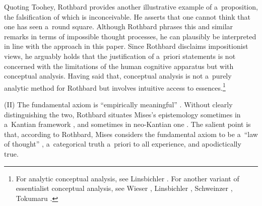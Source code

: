Quoting Toohey, Rothbard 
\parencite*[][p.28]{rothbard_praxeology:_1976} %
 provides another illustrative example of a~proposition, the falsification of which is inconceivable. He asserts that one cannot think that one has seen a~round square. Although Rothbard phrases this and similar remarks in terms of impossible thought processes, he can plausibly be interpreted in line with the approach in this paper. Since Rothbard disclaims impositionist views, he arguably holds that the justification of a~priori statements is not concerned with the limitations of the human cognitive apparatus but with conceptual analysis. Having said that, conceptual analysis is not a~purely analytic method for Rothbard but involves intuitive access to essences.\footnote{For analytic conceptual analysis, see Linsbichler 
\parencite*[][pp.81–83]{linsbichler_was_2017}. %
 For another variant of essentialist conceptual analysis, see Wieser 
\parencite*[][]{wieser_uber_1884}, %
 Linsbichler 
\parencites*[][]{linsbichler_sprachgeist_2021}[][]{linsbichler_case_2023}, %
 Schweinzer 
\parencite*[][]{schweinzer_two_2000}, %
 Tokumaru 
\parencite*[][]{tokumaru_wiesers_2015}.%
}



(II) The fundamental axiom is ``empirically meaningful'' 
\parencite[][p.318]{rothbard_defense_1957}. %
 Without clearly distinguishing the two, Rothbard situates Mises's epistemology sometimes in a~Kantian framework 
\parencite[][p.33]{rothbard_praxeology_2011}, %
 and sometimes in neo-Kantian one 
\parencite[][pp.317–318]{rothbard_defense_1957}. %
 The salient point is that, according to Rothbard, Mises considers the fundamental axiom to be a~``law of thought'' 
\parencite[][p.318]{rothbard_defense_1957}, %
 a~categorical truth a~priori to all experience, and apodictically true.



